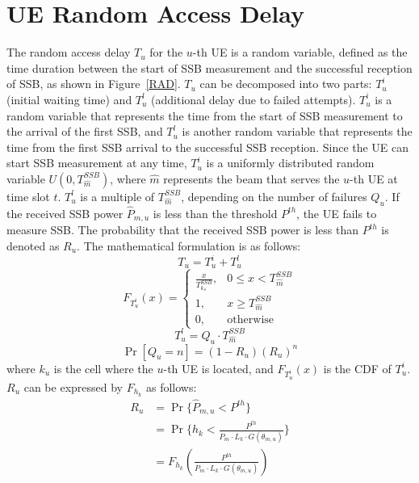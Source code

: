 \section{UE Random Access Delay}
The random access delay $T_u$ for the $u$-th UE is a random variable, defined as the time duration between the start of SSB measurement and the successful reception of SSB, as shown in Figure~\ref{RAD}. $T_u$ can be decomposed into two parts: $T_u^i$ (initial waiting time) and $T_u^l$ (additional delay due to failed attempts). $T_u^i$ is a random variable that represents the time from the start of SSB measurement to the arrival of the first SSB, and $T_u^l$ is another random variable that represents the time from the first SSB arrival to the successful SSB reception. Since the UE can start SSB measurement at any time, $T_u^i$ is a uniformly distributed random variable $U(0, T_{\hat{m}}^{SSB})$, where $\hat{m}$ represents the beam that serves the $u$-th UE at time slot $t$. $T_u^l$ is a multiple of $T_{\hat{m}}^{SSB}$, depending on the number of failures $Q_u$. If the received SSB power $\hat{P}_{m, u}$ is less than the threshold $P^{th}$, the UE fails to measure SSB. The probability that the received SSB power is less than $P^{th}$ is denoted as $R_u$. The mathematical formulation is as follows:
\begin{equation}
    T_u = T_u^i + T_u^l
\end{equation}
\begin{equation}
    F_{T_u^i}(x) =
    \begin{cases}
        \frac{x}{T_{k_u}^{SSB}}, & 0 \leq x < T_{\hat{m}}^{SSB} \\
        1, & x \geq T_{\hat{m}}^{SSB} \\
        0, & \text{otherwise}
    \end{cases}
\end{equation}
\begin{equation}
    T_u^l = Q_u \cdot T_{\hat{m}}^{SSB}
\end{equation}
\begin{equation}
    \Pr\left[Q_u = n\right] = (1 - R_u) (R_u)^n
\end{equation}
where $k_u$ is the cell where the $u$-th UE is located, and $F_{T_u^i}(x)$ is the CDF of $T_u^i$. $R_u$ can be expressed by $F_{h_k}$ as follows:
\begin{equation}
    \begin{aligned}
        R_u 
        &= \Pr\{\hat{P}_{m, u} < P^{th}\} \\
        &= \Pr\{h_k < \frac{P^{th}}{P_m \cdot L_k \cdot G(\theta_{m, u})}\} \\
        &= F_{h_k}(\frac{P^{th}}{P_m \cdot L_k \cdot G(\theta_{m, u})})
    \end{aligned}
\end{equation}


